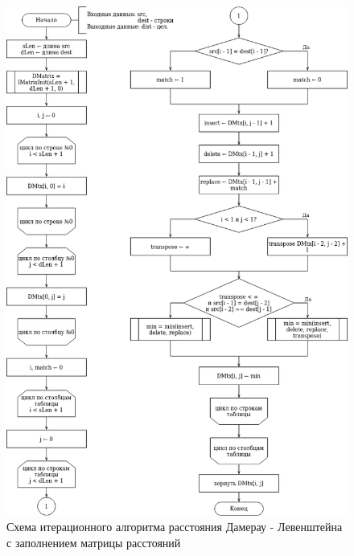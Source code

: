 \begin{figure}[h!]
	\begin{center}
		\includegraphics[scale=0.6]{assets/d-leven-iter.png}
	\end{center}
	
	\caption{Схема итерационного алгоритма расстояния Дамерау - Левенштейна с заполнением матрицы расстояний}
	\label{fig:d-iter-matrix}
\end{figure}

